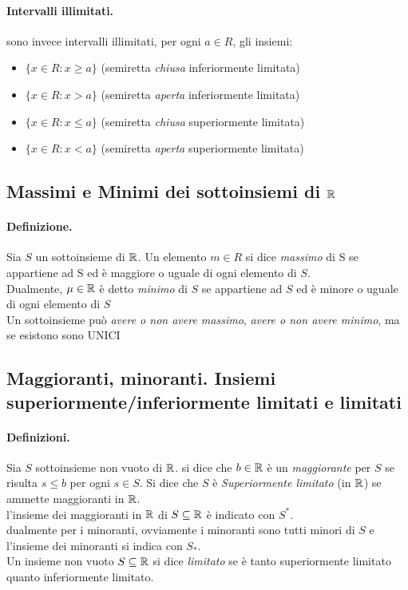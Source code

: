 \documentclass[12pt, a4paper, openany]{book}
\begin{document}
\paragraph{Intervalli illimitati.} sono invece intervalli illimitati, per ogni $a \in R$, gli insiemi:
\begin{itemize}
    \item[] $\{x \in R: x \geq a\}$ (semiretta \emph{chiusa} inferiormente limitata)
    \item[] $\{x \in R: x > a\}$ (semiretta \emph{aperta} inferiormente limitata)
    \item[] $\{x \in R: x \leq a\}$ (semiretta \emph{chiusa} superiormente limitata)
    \item[] $\{x \in R: x < a\}$ (semiretta \emph{aperta} superiormente limitata)
\end{itemize}

\subsection*{Massimi e Minimi dei sottoinsiemi di $\mathbb{R}$}
\paragraph{Definizione.} Sia $S$ un sottoinsieme di $\mathbb{R}$. Un elemento $m\in R$ si dice \emph{massimo} di S se appartiene ad S ed è maggiore o uguale di ogni elemento di $S$.
\\Dualmente, $\mu \in \mathbb{R} $ è detto \emph{minimo} di $S$ se appartiene ad $S$ ed è minore o uguale di ogni elemento di $S$
\\Un sottoinsieme può \emph{avere o non avere massimo}, \emph{avere o non avere minimo}, ma se esistono sono UNICI

\subsection*{Maggioranti, minoranti. Insiemi superiormente/inferiormente limitati e limitati}
\paragraph{Definizioni.} Sia $S$ sottoinsieme non vuoto di $\mathbb{R}$. si dice che $b\in \mathbb{R}$ è un \emph{maggiorante} per $S$ se risulta $s\leq b$ per ogni $s \in S$. Si dice che $S$ è \emph{Superiormente limitato} (in $\mathbb{R}$) se ammette maggioranti in $\mathbb{R}$.
\\l'insieme dei maggioranti in $\mathbb{R}$ di $S\subseteq \mathbb{R}$ è indicato con $S^*$.
\\dualmente per i minoranti, ovviamente i minoranti sono tutti minori di $S$ e l'insieme dei minoranti si indica con $S_*$.
\\Un insieme non vuoto $S \subseteq \mathbb{R}$ si dice \emph{limitato} se è tanto superiormente limitato quanto inferiormente limitato. 
\end{document}
